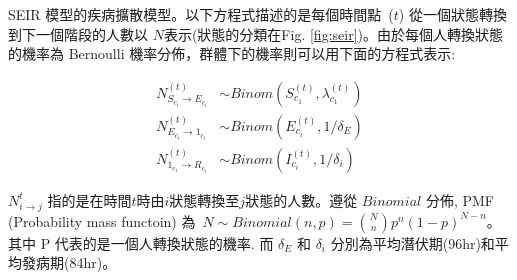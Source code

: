 
\begin{tcolorbox}[title=隨機 SEIR 模型]
SEIR 模型的疾病擴散模型。以下方程式描述的是每個時間點~($t$) 從一個狀態轉換到下一個階段的人數以 $N$表示(狀態的分類在Fig. \ref{fig:seir})。由於每個人轉換狀態的機率為 Bernoulli 機率分佈，群體下的機率則可以用下面的方程式表示:

\begin{align} 
    N^{(t)}_{S_{c_i}\rightarrow E_{c_i}} & \sim  Binom(S^{(t)}_{c_1},  \lambda^{(t)}_{c_1}) \label{eq:N_S2E}\\
    N^{(t)}_{E_{c_i}\rightarrow 1_{c_i}} & \sim Binom(E^{(t)}_{c_i}, 1/\delta_{E}) \\
    N^{(t)}_{1_{c_1}\rightarrow R_{c_i}} & \sim Binom(I^{(t)}_{c_i}, 1/ \delta_{i})  
\end{align}

$N^{t}_{i\rightarrow j}$ 指的是在時間$t$時由$i$狀態轉換至$j$狀態的人數。遵從 $Binomial$ 分佈, PMF (Probability mass functoin) 為~$N \sim Binomial(n,p) = {N\choose n} p^{n}(1-p)^{N-n} $。其中 P 代表的是一個人轉換狀態的機率. 而 $\delta_E$ 和 $\delta_i$ 分別為平均潛伏期(96hr)和平均發病期(84hr)\cite{vinfo2020}。
\end{tcolorbox}
